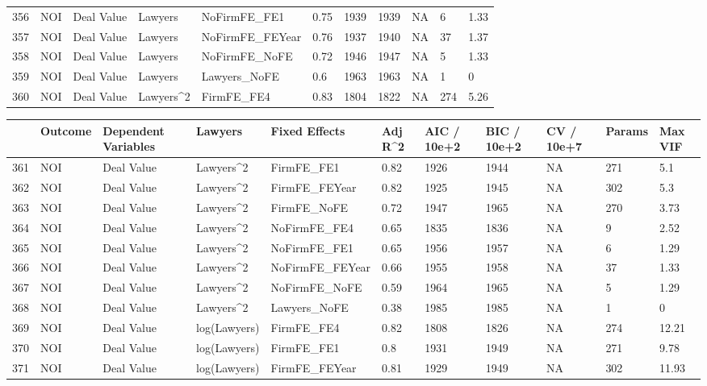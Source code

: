 \documentclass{article}
\begin{document}
\begin{table}[H]
\begin{tabular}{rllllllllll}
  356 & NOI & Deal Value & Lawyers & NoFirmFE\_FE1 & 0.75 & 1939 & 1939 & NA & 6 & 1.33 \\ 
  357 & NOI & Deal Value & Lawyers & NoFirmFE\_FEYear & 0.76 & 1937 & 1940 & NA & 37 & 1.37 \\ 
  358 & NOI & Deal Value & Lawyers & NoFirmFE\_NoFE & 0.72 & 1946 & 1947 & NA & 5 & 1.33 \\ 
  359 & NOI & Deal Value & Lawyers & Lawyers\_NoFE & 0.6 & 1963 & 1963 & NA & 1 & 0 \\ 
  360 & NOI & Deal Value & Lawyers^2 & FirmFE\_FE4 & 0.83 & 1804 & 1822 & NA & 274 & 5.26 \\ 
   \hline
\end{tabular}
\end{table}
\begin{table}[H]
\centering
\begin{tabular}{rllllllllll}
  \hline
 & Outcome & Dependent Variables & Lawyers & Fixed Effects & Adj R^2 & AIC / 10e+2 & BIC / 10e+2 & CV / 10e+7 & Params & Max VIF \\ 
  \hline
361 & NOI & Deal Value & Lawyers^2 & FirmFE\_FE1 & 0.82 & 1926 & 1944 & NA & 271 & 5.1 \\ 
  362 & NOI & Deal Value & Lawyers^2 & FirmFE\_FEYear & 0.82 & 1925 & 1945 & NA & 302 & 5.3 \\ 
  363 & NOI & Deal Value & Lawyers^2 & FirmFE\_NoFE & 0.72 & 1947 & 1965 & NA & 270 & 3.73 \\ 
  364 & NOI & Deal Value & Lawyers^2 & NoFirmFE\_FE4 & 0.65 & 1835 & 1836 & NA & 9 & 2.52 \\ 
  365 & NOI & Deal Value & Lawyers^2 & NoFirmFE\_FE1 & 0.65 & 1956 & 1957 & NA & 6 & 1.29 \\ 
  366 & NOI & Deal Value & Lawyers^2 & NoFirmFE\_FEYear & 0.66 & 1955 & 1958 & NA & 37 & 1.33 \\ 
  367 & NOI & Deal Value & Lawyers^2 & NoFirmFE\_NoFE & 0.59 & 1964 & 1965 & NA & 5 & 1.29 \\ 
  368 & NOI & Deal Value & Lawyers^2 & Lawyers\_NoFE & 0.38 & 1985 & 1985 & NA & 1 & 0 \\ 
  369 & NOI & Deal Value & log(Lawyers) & FirmFE\_FE4 & 0.82 & 1808 & 1826 & NA & 274 & 12.21 \\ 
  370 & NOI & Deal Value & log(Lawyers) & FirmFE\_FE1 & 0.8 & 1931 & 1949 & NA & 271 & 9.78 \\ 
  371 & NOI & Deal Value & log(Lawyers) & FirmFE\_FEYear & 0.81 & 1929 & 1949 & NA & 302 & 11.93 \\ 

\end{tabular}
\end{table}
\end{document}

